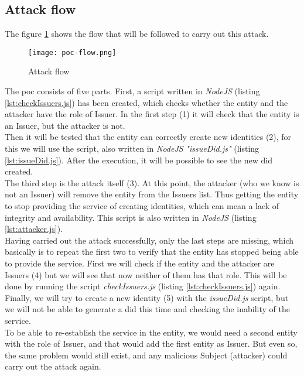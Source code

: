 \subsection{Attack flow}
        The figure \ref{fig:poc-flow} shows the flow that will be followed to carry out this attack.
        \begin{figure}[h]
            \centering
            \texttt{[image: poc-flow.png]}
            \caption{Attack flow}
            \label{fig:poc-flow}
        \end{figure}
        
        The \acrshort{poc} consists of five parts. First, a script written in \textit{NodeJS} (listing \ref{lst:checkIssuers.js}) has been created, which checks whether the entity and the attacker have the role of Issuer. In the first step (1) it will check that the entity is an Issuer, but the attacker is not.\\
        
        
        Then it will be tested that the entity can correctly create new identities (2), for this we will use the script, also written in \textit{NodeJS} \textit{"issueDid.js"} (listing \ref{lst:issueDid.js}). After the execution, it will be possible to see the new \acrshort{did} created.\\
        
        
        The third step is the attack itself (3). At this point, the attacker (who we know is not an Issuer) will remove the entity from the Issuers list. Thus getting the entity to stop providing the service of creating identities, which can mean a lack of integrity and availability. This script is also written in \textit{NodeJS} (listing \ref{lst:attacker.js}).\\
        
        
        Having carried out the attack successfully, only the last steps are missing, which basically is to repeat the first two to verify that the entity has stopped being able to provide the service. First we will check if the entity and the attacker are Issuers (4) but we will see that now neither of them has that role. This will be done by running the script \textit{checkIssuers.js} (listing \ref{lst:checkIssuers.js}) again. \\
        
        Finally, we will try to create a new identity (5) with the \textit{issueDid.js} script, but we will not be able to generate a \acrshort{did} this time and checking the inability of the service.\\
        
        To be able to re-establish the service in the entity, we would need a second entity with the role of Issuer, and that would add the first entity as Issuer. But even so, the same problem would still exist, and any malicious Subject (attacker) could carry out the attack again.
